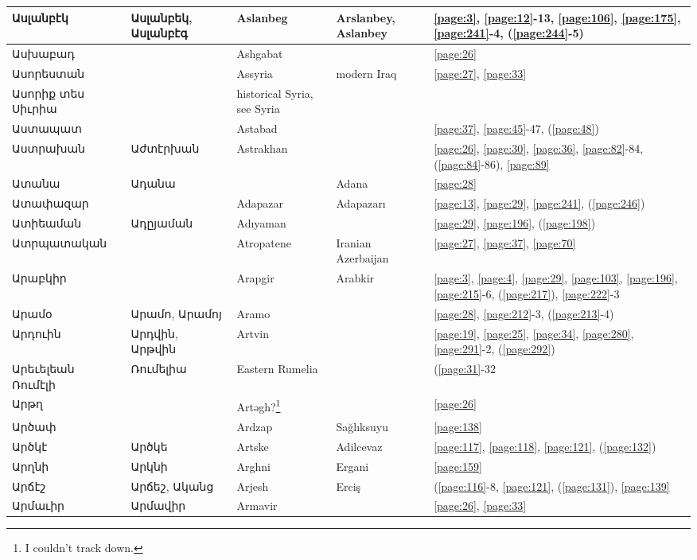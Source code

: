 \begin{center}
\begin{longtable}{|p{}|p{3cm}|p{3cm}|p{2cm}|p{3cm}|}
Ասլանբէկ& Ասլանբեկ, Ասլանբէգ& 
{Aslanbeg}&Arslanbey, Aslanbey &\ref{page:3}, \ref{page:12}-13, \ref{page:106}, \ref{page:175}, \ref{page:241}-4, (\ref{page:244}-5)\\ \hline
Ասխաբադ& & 
{Ashgabat}& &\ref{page:26}\\ \hline
Ասորեստան& & 
Assyria& modern Iraq&\ref{page:27}, \ref{page:33}\\ \hline
Ասորիք տես Սիւրիա& &  historical Syria, see Syria&   &\\ \hline
Աստապատ& & 
{Astabad}& &\ref{page:37}, \ref{page:45}-47, (\ref{page:48})\\ \hline
Աստրախան& Աժտէրխան& 
{Astrakhan}& &\ref{page:26}, \ref{page:30}, \ref{page:36}, \ref{page:82}-84, (\ref{page:84}-86), \ref{page:89}\\ \hline
Ատանա& Ադանա& &
Adana&\ref{page:28}\\ \hline
Ատափազար& & 
Adapazar  &Adapazarı &\ref{page:13}, \ref{page:29}, \ref{page:241}, (\ref{page:246})\\ \hline
Ատիեաման& Ադըյաման& 
{Adıyaman}& &\ref{page:29}, \ref{page:196}, (\ref{page:198})\\ \hline
Ատրպատական& & 
{Atropatene}& Iranian Azerbaijan&\ref{page:27}, \ref{page:37}, \ref{page:70}\\ \hline
Արաբկիր& &
Arapgir &Arabkir &\ref{page:3}, \ref{page:4}, \ref{page:29}, \ref{page:103}, \ref{page:196}, \ref{page:215}-6, (\ref{page:217}), \ref{page:222}-3\\ \hline
Արամօ& Արամո, Արամոյ
&Aramo & &\ref{page:28}, \ref{page:212}-3, (\ref{page:213}-4)\\ \hline
Արդուին&Արդվին, Արթվին  &Artvin&
 &\ref{page:19}, \ref{page:25}, \ref{page:34}, \ref{page:280}, \ref{page:291}-2, (\ref{page:292})\\ \hline
Արեւելեան Ռումէլի&Ռումելիա
& {Eastern Rumelia} & &(\ref{page:31}-32\\ \hline
Արթղ& &
{Artəgh?}\footnote{I couldn't track down.}& &\ref{page:26}\\ \hline
Արծափ& &  {Ardzap}& Sağlıksuyu&\ref{page:138}\\ \hline
Արծկէ& Արծկե
& {Artske} &Adilcevaz &\ref{page:117}, \ref{page:118}, \ref{page:121}, (\ref{page:132})\\ \hline
Արղնի& Արկնի  
&{Arghni} & Ergani&\ref{page:159}\\ \hline
Արճէշ& Արճեշ, Ականց& 
{Arjesh}& Erciş&(\ref{page:116}-8, \ref{page:121}, (\ref{page:131}), \ref{page:139}\\ \hline
Արմաւիր& Արմավիր&
Armavir& &\ref{page:26}, \ref{page:33}\\ \hline

\end{longtable}
\end{center}
